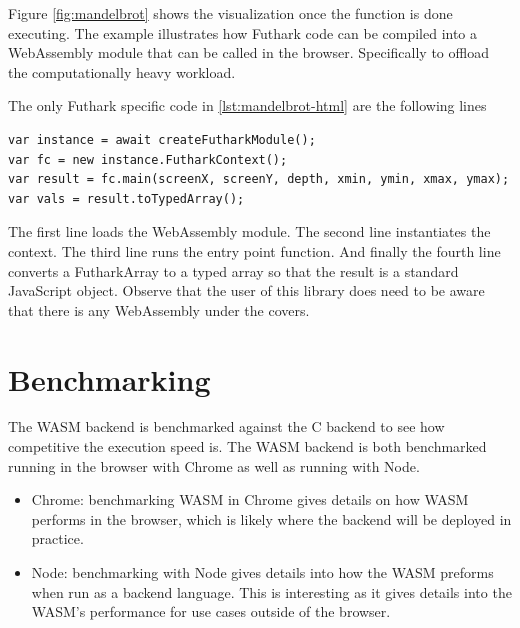\documentclass[11pt]{book}
\begin{document}
Figure \ref{fig:mandelbrot} shows the visualization once the function is done executing. The example illustrates how Futhark code can be compiled into a WebAssembly module that can be called in the browser. Specifically to offload the computationally heavy workload.

The only Futhark specific code in \ref{lst:mandelbrot-html} are the following lines
\begin{verbatim}
var instance = await createFutharkModule();
var fc = new instance.FutharkContext();
var result = fc.main(screenX, screenY, depth, xmin, ymin, xmax, ymax);
var vals = result.toTypedArray();
\end{verbatim}
The first line loads the WebAssembly module. The second line instantiates the context. The third line runs the entry point function. And finally the fourth line converts a FutharkArray to a typed array so that the result is a standard JavaScript object. Observe that the user of this library does need to be aware that there is any WebAssembly under the covers. 






\section{Benchmarking}

The WASM backend is benchmarked against the C backend to see how competitive the execution speed is. The WASM backend is both benchmarked running in the browser with Chrome as well as running with Node. 
\begin{itemize}
    \item Chrome: benchmarking WASM in Chrome gives details on how WASM performs in the browser, which is likely where the backend will be deployed in practice.
    \item Node: benchmarking with Node gives details into how the WASM preforms when run as a backend language. This is interesting as it gives details into the WASM's performance for use cases outside of the browser.
\end{itemize}
\end{document}

